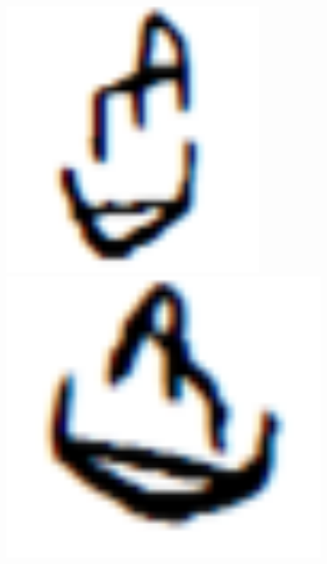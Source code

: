 \documentclass[journal]{IEEEtran}
\begin{document}
\begin{figure}[h]
	\centering
	\begin{minipage}{0.2\linewidth}
		\includegraphics[width=0.8\linewidth]{fig/observation-1-1.png}
		\includegraphics[width=0.8\linewidth]{fig/observation-1-2.png}
	\end{minipage}
	\begin{minipage}{0.2\linewidth}

\end{minipage}
\end{figure}
\end{document}

